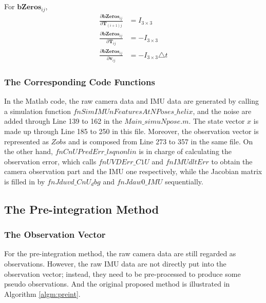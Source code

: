 \documentclass[12pt]{article}   %
\begin{document}
For $\textbf{bZeros}_{ij}$,
\begin{align}
\frac{\partial \textbf{bZeros}_{ij}}{\partial \textbf{T}_{(i+1)j}} &= I_{3\times 3} \\
\frac{\partial \textbf{bZeros}_{ij}}{\partial \textbf{T}_{ij}} &= - I_{3\times 3} \\
\frac{\partial \textbf{bZeros}_{ij}}{\partial \textbf{v}_{ij}} &= - I_{3\times 3} \triangle t  
\end{align}

\subsubsection{The Corresponding Code Functions}

In the Matlab code, the raw camera data and IMU data are generated by calling a simulation function $fnSimIMUnFeaturesAtNPoses\_helix$, and the noise are added through Line 139 to 162 in the $Main\_simuNpose.m$. The state vector $x$ is made up through Line 185 to 250 in this file. Moreover, the observation vector is represented as $Zobs$ and is composed from Line 273 to 357 in the same file. On the other hand, $fnCnUPredErr\_lsqnonlin$ is in charge of calculating the observation error, which calls $fnUVDErr\_C1U$ and $fnIMUdltErr$ to obtain the camera observation part and the IMU one respectively, while the Jacobian matrix is filled in by $fnJduvd\_CnU_dbg$ and $fnJdaw0\_IMU$ sequentially. 

\subsection{The Pre-integration Method}

\subsubsection{The Observation Vector}

For the pre-integration method, the raw camera data are still regarded as observations. However, the raw IMU data are not directly put into the observation vector; instead, they need to be pre-processed to produce some pseudo observations. And the original proposed method \cite{Lupton2012} is illustrated in Algorithm \ref{algm:preint}.
\end{document}
